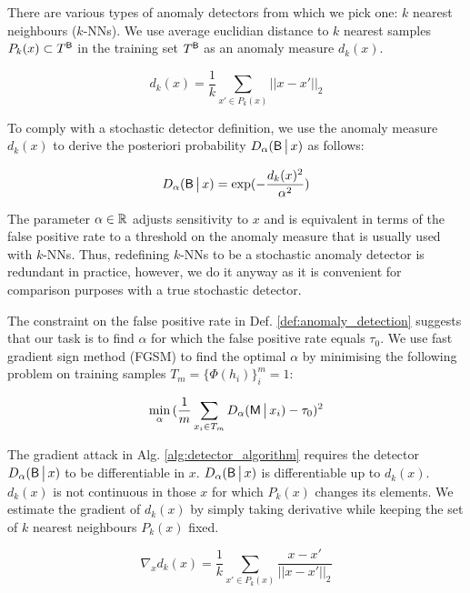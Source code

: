 There are various types of anomaly detectors from which we pick one: $k$ nearest neighbours ($k$-NNs). We use average euclidian distance to $k$ nearest samples $P_k(x) \subset T^{\mathsf{B}}$ in the training set $T^{\mathsf{B}}$ as an anomaly measure $d_k(x)$.

\begin{equation}
    d_k(x) = \frac{1}{k} \sum_{x' \in P_k(x)} || x - x' ||_2
\end{equation}

To comply with a stochastic detector definition, we use the anomaly measure $d_k(x)$ to derive the posteriori probability $D_\alpha(\mathsf{B} \,\big|\, x)$ as follows:

\begin{equation}\label{eq:knn_detector}
    D_\alpha(\mathsf{B} \,\big|\, x) = \exp(-\frac{d_k(x)^2}{\alpha^2})
\end{equation}

The parameter $\alpha \in \mathbb{R}$ adjusts sensitivity to $x$ and is equivalent in terms of the false positive rate to a threshold on the anomaly measure that is usually used with $k$-NNs. Thus, redefining $k$-NNs to be a stochastic anomaly detector is redundant in practice, however, we do it anyway as it is convenient for comparison purposes with a true stochastic detector.

The constraint on the false positive rate in Def. \ref{def:anomaly_detection} suggests that our task is to find $\alpha$ for which the false positive rate equals $\tau_0$. We use fast gradient sign method (FGSM) to find the optimal $\alpha$ by minimising the following problem on training samples $T_m = \{\Phi(h_i)\}^m_i=1$:

\begin{equation}
    \min_\alpha \, (\frac{1}{m}\sum_{x_i \in T_m} D_\alpha(\mathsf{M} \,\big|\, x_i) - \tau_0)^2
\end{equation}

The gradient attack in Alg. \ref{alg:detector_algorithm} requires the detector $D_\alpha(\mathsf{B} \,\big|\, x)$ to be differentiable in $x$. $D_\alpha(\mathsf{B} \,\big|\, x)$ is differentiable up to $d_k(x)$. $d_k(x)$ is not continuous in those $x$ for which $P_k(x)$ changes its elements. We estimate the gradient of $d_k(x)$ by simply taking derivative while keeping the set of $k$ nearest neighbours $P_k(x)$ fixed.

\begin{equation}
    \nabla_x d_k(x) = \frac{1}{k} \sum_{x' \in P_k(x)} \frac{x - x'}{ || x - x' ||_2 }
\end{equation}

